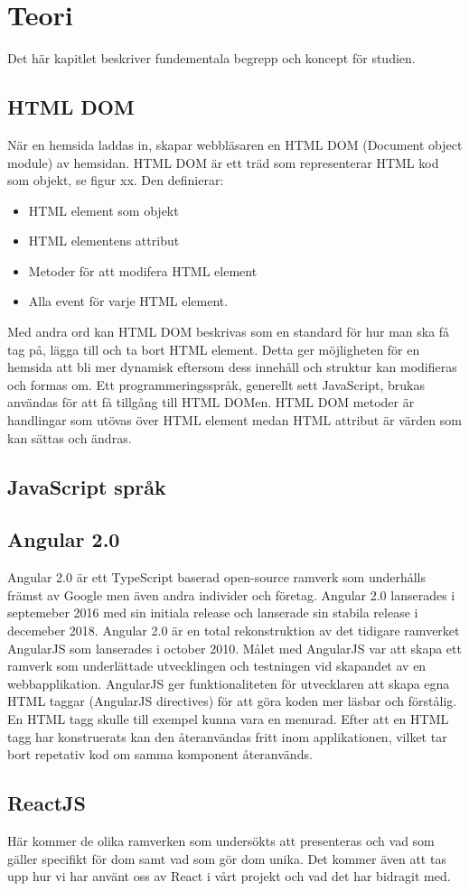 \section{Teori}
\label{sec:axel-theory}
Det här kapitlet beskriver fundementala begrepp och koncept för studien.

\subsection{HTML DOM}
När en hemsida laddas in, skapar webbläsaren en HTML DOM (Document object module) av hemsidan. HTML DOM är ett träd som representerar HTML kod som objekt, se figur xx. Den definierar:
\begin{itemize}
\item HTML element som objekt
\item HTML elementens attribut
\item Metoder för att modifera HTML element
\item Alla event för varje HTML element.
\end{itemize} 
Med andra ord kan HTML DOM beskrivas som en standard för hur man ska få tag på, lägga till och ta bort HTML element. Detta ger möjligheten för en hemsida att bli mer dynamisk eftersom dess innehåll och struktur kan modifieras och formas om. Ett programmeringsspråk, generellt sett JavaScript, brukas användas för att få tillgång till HTML DOMen. HTML DOM metoder är handlingar som utövas över HTML element medan HTML attribut är värden som kan sättas och ändras. 


\subsection{JavaScript språk}


\subsection{Angular 2.0}
Angular 2.0 är ett TypeScript baserad open-source ramverk som underhålls främst av Google men även andra individer och företag. Angular 2.0 lanserades i septemeber 2016 med sin initiala release och lanserade sin stabila release i decemeber 2018. Angular 2.0 är en total rekonstruktion av det tidigare ramverket AngularJS som lanserades i october 2010. Målet med AngularJS var att skapa ett ramverk som underlättade utvecklingen och testningen vid skapandet av en webbapplikation. AngularJS ger funktionaliteten för utvecklaren att skapa egna HTML taggar (AngularJS directives) för att göra koden mer läsbar och förstålig. En HTML tagg skulle till exempel kunna vara en menurad. Efter att en HTML tagg har konstruerats kan den återanvändas fritt inom applikationen, vilket tar bort repetativ kod om samma komponent återanvänds. 

\subsection{ReactJS}


Här kommer de olika ramverken som undersökts att presenteras och vad som gäller specifikt för dom samt vad som gör dom unika. Det kommer även att tas upp hur vi har använt oss av React i vårt projekt och vad det har bidragit med. 
